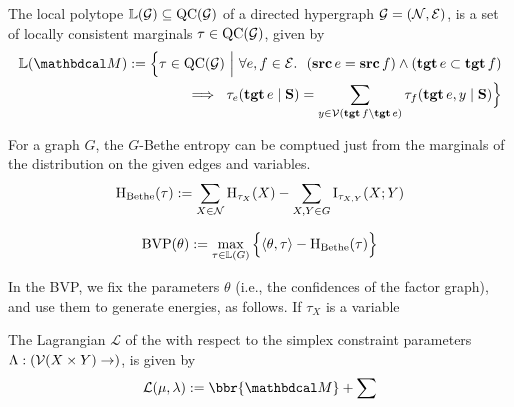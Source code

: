 \documentclass[dyna.tex]{subfiles}
\begin{document}
\begin{defn}
    The local polytope $\mathbb L(\mathcal G) \subseteq \operatorname{\mathrm{QC}}(\mathcal G)$ of a directed hypergraph $\mathcal G = (\mathcal N, \mathcal E)$, is a set of locally consistent marginals $\tau \in \operatorname{\mathrm{QC}}(\mathcal G)$, given by
    \begin{equation}
        \begin{split}
            \mathbb L(\dg M) := \Big\{ \tau \in \QC(\mathcal G)
                ~\Big|~ \forall e, f \in \Ed.~~(\src e = \src f)\land(\tgt e \subset \tgt f) \\
                    ~\implies~ \tau_e(\tgt e \mid \mat S) =  \sum_{y \in \V(\tgt f  \setminus \tgt e)} \tau_f(\tgt e, y \mid \mat S)  \Big\}
        \end{split}
\end{equation}

\end{defn}

\begin{defn}
    For a graph $G$, the $G$-Bethe entropy can be comptued just from the marginals
    of the distribution on the given edges and variables.
    \begin{equation}
        \operatorname{\mathrm{H}}_{\mathrm{Bethe}}(\tau) := \sum_{X \in \mathcal N} \operatorname{\mathrm{H}}_{\tau_X}(X) - \sum_{X,Y \in G} \operatorname{\mathrm{I}}_{\tau_{X,Y}}(X; Y)
    \end{equation}
\end{defn}

\begin{defn}
    \begin{equation}
        \mathop{\mathrm{BVP}}(\theta) := \max_{\tau \in \mathbb L(G)}
            \Big\{ \langle \theta, \tau\rangle - \operatorname{\mathrm{H}}_{\mathrm{Bethe}}(\tau)\Big\}
    \end{equation}
\end{defn}

In the BVP, we fix the parameters $\theta$ (i.e., the confidences of the factor graph),
and use them to generate energies, as follows. If $\tau_X$ is a variable

\begin{defn}

    The Lagrangian $\mathcal L$ of the with respect to the simplex constraint parameters $\Lambda : (\mathcal V(X\times Y) \to )$, is given by
    \begin{equation}
        \mathcal L(\mu, \lambda) := \bbr{\dg M} + \sum
    \end{equation}
\end{defn}
\end{document}

